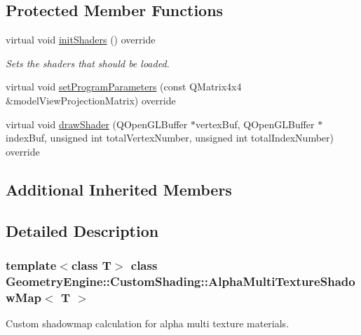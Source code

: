 \subsection*{Protected Member Functions}
\begin{DoxyCompactItemize}
\item 
\mbox{\label{class_geometry_engine_1_1_custom_shading_1_1_alpha_multi_texture_shadow_map_afcd3ea2fcac804756e3f7297934b23a8}} 
virtual void \mbox{\hyperlink{class_geometry_engine_1_1_custom_shading_1_1_alpha_multi_texture_shadow_map_afcd3ea2fcac804756e3f7297934b23a8}{init\+Shaders}} () override
\begin{DoxyCompactList}\small\item\em Sets the shaders that should be loaded. \end{DoxyCompactList}\item 
virtual void \mbox{\hyperlink{class_geometry_engine_1_1_custom_shading_1_1_alpha_multi_texture_shadow_map_ae4bed1f5f5d0200e614d62f42d58048c}{set\+Program\+Parameters}} (const Q\+Matrix4x4 \&model\+View\+Projection\+Matrix) override
\item 
virtual void \mbox{\hyperlink{class_geometry_engine_1_1_custom_shading_1_1_alpha_multi_texture_shadow_map_a6bd8b95d6b83ac8513e4885899c33a19}{draw\+Shader}} (Q\+Open\+G\+L\+Buffer $\ast$vertex\+Buf, Q\+Open\+G\+L\+Buffer $\ast$index\+Buf, unsigned int total\+Vertex\+Number, unsigned int total\+Index\+Number) override
\end{DoxyCompactItemize}
\subsection*{Additional Inherited Members}


\subsection{Detailed Description}
\subsubsection*{template$<$class T$>$\newline
class Geometry\+Engine\+::\+Custom\+Shading\+::\+Alpha\+Multi\+Texture\+Shadow\+Map$<$ T $>$}

Custom shadowmap calculation for alpha multi texture materials. 

